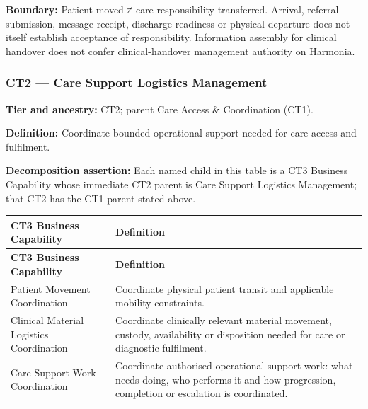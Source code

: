 \textbf{Boundary:} Patient moved ≠ care responsibility transferred. Arrival, referral submission, message receipt, discharge readiness or physical departure does not itself establish acceptance of responsibility. Information assembly for clinical handover does not confer clinical-handover management authority on Harmonia.

\label{rad:business:421}
\subsubsection*{CT2 — Care Support Logistics Management}
\label{rad:business:423}

\textbf{Tier and ancestry:} CT2; parent Care Access \& Coordination (CT1).

\label{rad:business:425}

\textbf{Definition:} Coordinate bounded operational support needed for care access and fulfilment.

\label{rad:business:427}

\textbf{Decomposition assertion:} Each named child in this table is a CT3 Business Capability whose immediate CT2 parent is Care Support Logistics Management; that CT2 has the CT1 parent stated above.

\label{rad:business:429}
\begingroup\small\setlength{\TableWidth}{\dimexpr\linewidth-4\tabcolsep-3\arrayrulewidth\relax}
\begin{longtable}{|>{\raggedright\arraybackslash}p{0.35\TableWidth}|>{\raggedright\arraybackslash}p{0.65\TableWidth}|}
\hline\rowcolor{TableHead}\textbf{CT3 Business Capability} & \textbf{Definition}\\\hline\endfirsthead
\hline\rowcolor{TableHead}\textbf{CT3 Business Capability} & \textbf{Definition}\\\hline\endhead
\hline\endfoot
Patient Movement Coordination & Coordinate physical patient transit and applicable mobility constraints.\\\hline
Clinical Material Logistics Coordination & Coordinate clinically relevant material movement, custody, availability or disposition needed for care or diagnostic fulfilment.\\\hline
Care Support Work Coordination & Coordinate authorised operational support work: what needs doing, who performs it and how progression, completion or escalation is coordinated.\\\hline
\end{longtable}\endgroup
{}\label{rad:business:435}

